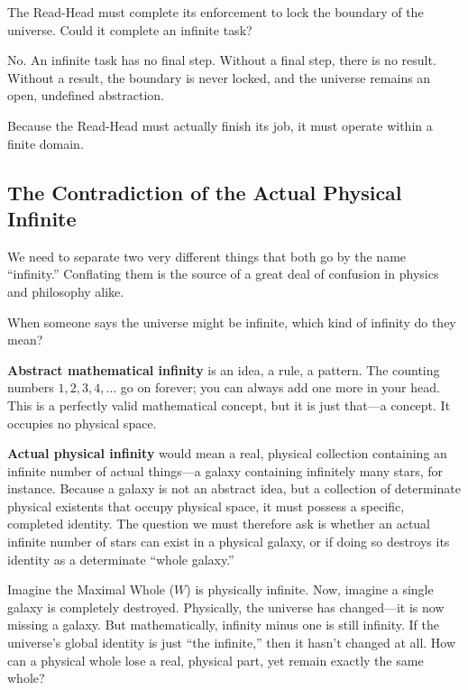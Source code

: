 \documentclass[11pt]{article}
\theoremstyle{canonstyle}
\begin{document}
\begin{reflect}
The Read-Head must complete its enforcement to lock the boundary of the universe. Could it complete an infinite task?
\end{reflect}

No. An infinite task has no final step. Without a final step, there is no result. Without a result, the boundary is never locked, and the universe remains an open, undefined abstraction. 

Because the Read-Head must actually finish its job, it must operate within a finite domain. 

\subsection{The Contradiction of the Actual Physical Infinite}

We need to separate two very different things that both go by the name ``infinity.'' Conflating them is the source of a great deal of confusion in physics and philosophy alike.

\begin{reflect}
When someone says the universe might be infinite, which kind of infinity do they mean?
\end{reflect}

\textbf{Abstract mathematical infinity} is an idea, a rule, a pattern. The counting numbers $1, 2, 3, 4, \ldots$ go on forever; you can always add one more in your head. This is a perfectly valid mathematical concept, but it is just that---a concept. It occupies no physical space.

\textbf{Actual physical infinity} would mean a real, physical collection containing an infinite number of actual things---a galaxy containing infinitely many stars, for instance. Because a galaxy is not an abstract idea, but a collection of determinate physical existents that occupy physical space, it must possess a specific, completed identity. The question we must therefore ask is whether an actual infinite number of stars can exist in a physical galaxy, or if doing so destroys its identity as a determinate ``whole galaxy.''

\begin{reflect}
Imagine the Maximal Whole ($W$) is physically infinite. Now, imagine a single galaxy is completely destroyed. Physically, the universe has changed---it is now missing a galaxy. But mathematically, infinity minus one is still infinity. If the universe's global identity is just ``the infinite,'' then it hasn't changed at all. How can a physical whole lose a real, physical part, yet remain exactly the same whole?
\end{reflect}
\end{document}
